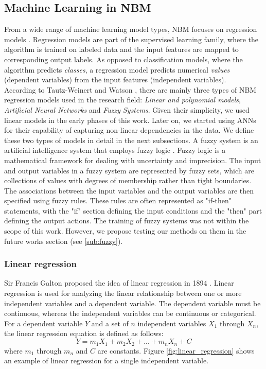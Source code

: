 \subsection{Machine Learning in NBM}
  From a wide range of machine learning model types, NBM focuses on regression models \cite{Regression}. Regression models are part of the supervised learning family, 
  where the algorithm is trained on labeled data and the input features are mapped to corresponding output labels. 
  As opposed to classification models, where the algorithm predicts \emph{classes}, a regression model predicts numerical \emph{values} (dependent variables) from the input 
  features (independent variables).\\
  According to Tautz-Weinert and Watson \cite{SCADA_NBM_Review}, there are mainly three types of NBM regression models used in the research field: \emph{Linear and polynomial models},
  \emph{Artificial Neural Networks} and \emph{Fuzzy Systems}. Given their simplicity, we used linear models in the early phases of this work. Later on, we started using 
  ANNs for their capability of capturing non-linear dependencies in the data. We define these two types of models in detail in the next subsections.
  A fuzzy system \cite{Neuro_fuzzy} is an artificial intelligence system that employs fuzzy logic \cite{fuzzy_sets}. Fuzzy logic is a mathematical framework for 
  dealing with uncertainty and imprecision.
  The input and output variables in a fuzzy system are represented by fuzzy sets, which are collections of values with degrees of membership rather than tight boundaries. 
  The associations between the input variables and the output variables are then specified using fuzzy rules. 
  These rules are often represented as "if-then" statements, with the "if" section defining the input conditions and the "then" part defining the output actions.
  The training of fuzzy systems was not within the scope of this work. However, we propose testing our methods on them in the future works section (see \ref{sub:fuzzy}).

  \subsubsection{Linear regression}
    Sir Francis Galton proposed the idea of linear regression in 1894 \cite{Natural_Inheritance}.
    Linear regression is used for analyzing the linear relationship between one or more independent variables and a dependent variable.
    The dependent variable must be continuous, whereas the independent variables can be continuous or categorical. For a dependent variable $Y$ and a set of $n$ independent
    variables $X_1$ through $X_n$, the linear regression equation is defined as follows:
    \begin{equation}
      Y = m_1X_1 + m_2X_2 + ... + m_nX_n + C
    \end{equation}
    where $m_1$ through $m_n$ and $C$ are constants. Figure \ref{fig:linear_regression} shows an example of linear regression for a single independent variable.

